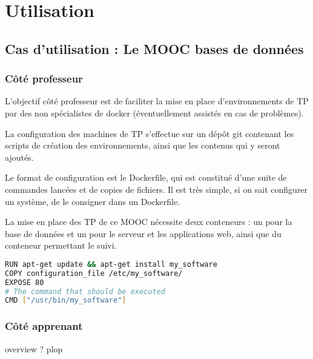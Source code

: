 \documentclass[a4paper,11pt]{report}
\begin{document}
\subsection{}

\subsection{}

\chapter{Utilisation}



\section{Cas d'utilisation : Le MOOC bases de données}

\subsection{Côté professeur}

L'objectif côté professeur est de faciliter la mise en place d'environnements de TP par des non spécialistes de docker (éventuellement assistés en cas de problèmes).

La configuration des machines de TP s'effectue sur un dépôt git contenant les scripts de création des environnements, ainsi que les contenus qui y seront ajoutés.

Le format de configuration est le Dockerfile, qui est constitué d'une suite de commandes lancées et de copies de fichiers. Il est très simple, si on sait configurer un système, de le consigner dans un Dockerfile.

La mise en place des TP de ce MOOC nécessite deux conteneurs : un pour la base de données et un pour le serveur et les applications web, ainsi que du conteneur permettant le suivi.

\begin{lstlisting}[language=Bash,caption={Dockerfile de base}]
RUN apt-get update && apt-get install my_software
COPY configuration_file /etc/my_software/
EXPOSE 80
# The command that should be executed
CMD ["/usr/bin/my_software"]
\end{lstlisting}


\subsection{Côté apprenant}

overview ?
plop\cite{AbedonHymanThomas2003}
\cite{website:fermentas-lambda}

\printbibliography
\end{document}
